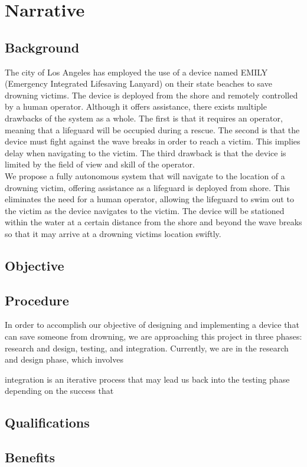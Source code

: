 \documentclass[11pt]{article}
\begin{document}
\section*{Narrative}

\subsection*{Background}

The city of Los Angeles has employed the use of a device named EMILY (Emergency Integrated Lifesaving Lanyard) on their state beaches to save drowning victims. The device is deployed from the shore and remotely controlled by a human operator. Although it offers assistance, there exists multiple drawbacks of the system as a whole. The first is that it requires an operator, meaning that a lifeguard will be occupied during a rescue. The second is that the device must fight against the wave breaks in order to reach a victim. This implies delay when navigating to the victim. The third drawback is that the device is limited by the field of view and skill of the operator.\\

We propose a fully autonomous system that will navigate to the location of a drowning victim, offering assistance as a lifeguard is deployed from shore. This eliminates the need for a human operator, allowing the lifeguard to swim out to the victim as the device navigates to the victim. The device will be stationed within the water at a certain distance from the shore and beyond the wave breaks so that it may arrive at a drowning victims location swiftly.  

\subsection*{Objective}

\subsection*{Procedure}

In order to accomplish our objective of designing and implementing a device that can save someone from drowning, we are approaching this project in three phases: research and design, testing, and integration. Currently, we are in the research and design phase, which involves 


integration is an iterative process that may lead us back into the testing phase depending on the success that 

\subsection*{Qualifications}

\subsection*{Benefits}
\end{document}
